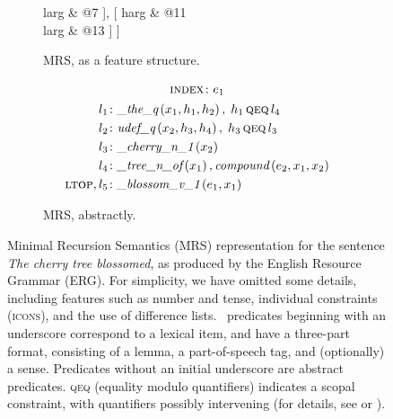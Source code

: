 \documentclass[output=paper,nonflat]{langsci/langscibook}
\begin{document}
\begin{figure}
\begin{subfigure}{\textwidth}
\begin{avm}
				larg & @7 ],
			[
				harg & @{11} \\
				larg & @{13} ] \;\Bigg\rangle ]
	\end{avm}
	\caption{MRS, as a feature structure.}
\end{subfigure}
\begin{subfigure}{\textwidth}
	\centering
	\setlength{\abovedisplayskip}{1ex}
	\setlength{\belowdisplayskip}{1ex}
	\begin{gather*}
		\textsc{index}\colon e_1 \\
		\begin{aligned}
			l_1\colon & \textit{\_the\_q}\left(x_1,h_1,h_2\right),\; h_1 \,\textsc{qeq}\, l_4 \\
			l_2\colon & \textit{udef\_q}\left(x_2,h_3,h_4\right),\; h_3 \,\textsc{qeq}\, l_3 \\
			l_3\colon & \textit{\_cherry\_n\_1}\left(x_2\right) \\
			l_4\colon & \textit{\_tree\_n\_of}\left(x_1\right), \textit{compound}\left(e_2,x_1,x_2\right) \\
			\textsc{ltop}, l_5\colon & \textit{\_blossom\_v\_1}\left(e_1,x_1\right)
		\end{aligned}
	\end{gather*}
	\caption{MRS, abstractly.}
\end{subfigure}
\caption{%
	Minimal Recursion Semantics (MRS)
	representation for the sentence \textit{The cherry tree blossomed},
	as produced by the English Resource Grammar (ERG).
	For simplicity, we have omitted some details, including
	features such as number and tense,
	individual constraints (\textsc{icons}),
	and the use of difference lists.
	\delphin\ predicates beginning with an underscore correspond to a lexical item,
	and have a three-part format,
	consisting of a lemma, a part-of-speech tag, and (optionally) a sense.
	Predicates without an initial underscore are abstract predicates.
	\textsc{qeq} (equality modulo quantifiers) indicates a scopal constraint,
	with quantifiers possibly intervening
	(for details, see \citealt{CFPS2005a} or ).
}
\label{cl:fig:mrs}
\end{figure}
\end{document}
